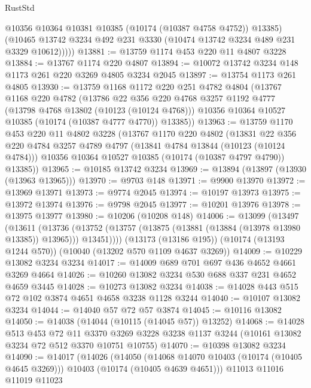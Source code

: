 \begin{lexlean}{RustStd}
\begin{coremodule}
            @10356
            @10364
            @10381
            @10385
            (@10174 (@10387 @4758 @4752))
            @13385)
          (@10465 @13742 @3234 @492 @231 @3330 (@10474 @13742 @3234 @489 @231 @3329 @10612)))))
@13881 := @13759 @1174 @453 @220 @11 @4807 @3228
@13884 := @13767 @1174 @220 @4807
@13894 := @10072 @13742 @3234 @148 @1173 @261 @220 @3269 @4805 @3234 @2045
@13897 := @13754 @1173 @261 @4805
@13930 := @13759
    @1168
    @1172
    @220
    @251
    @4782
    @4804
    (@13767
      @1168
      @220
      @4782
      (@13786
        @22
        @356
        @220
        @4768
        @3257
        @1192
        @4777
        (@13798 @4768 @13802 (@10123 (@10124 @4768)))
        @10356
        @10364
        @10527
        @10385
        (@10174 (@10387 @4777 @4770))
        @13385))
@13963 := @13759
    @1170
    @453
    @220
    @11
    @4802
    @3228
    (@13767
      @1170
      @220
      @4802
      (@13831
        @22
        @356
        @220
        @4784
        @3257
        @4789
        @4797
        (@13841 @4784 @13844 (@10123 (@10124 @4784)))
        @10356
        @10364
        @10527
        @10385
        (@10174 (@10387 @4797 @4790))
        @13385))
@13965 := @10185 @13742 @3234
@13969 := @13894 (@13897 (@13930 (@13963 @13965)))
@13970 := @9703 @148
@13971 := @9900 @13970
@13972 := @13969 @13971
@13973 := @9774 @2045
@13974 := @10197 @13973
@13975 := @13972 @13974
@13976 := @9798 @2045
@13977 := @10201 @13976
@13978 := @13975 @13977
@13980 := @10206 (@10208 @148)
@14006 := @13099
    (@13497
      (@13611
        (@13736 (@13752 (@13757 (@13875 (@13881 (@13884 (@13978 @13980 @13385)) @13965))) @13451))))
    (@13173 (@13186 @195))
    (@10174 (@13193 @1244 @570))
    (@10040 (@13202 @570 @1109 @4637 @3269))
@14009 := @10229 @13082 @3234 @3234
@14017 := @14009 @689 @701 @697 @436 @4652 @4661 @3269 @4664
@14026 := @10260 @13082 @3234 @530 @688 @337 @231 @4652 @4659 @3445
@14028 := @10273 @13082 @3234
@14038 := @14028 @443 @515 @72 @102 @3874 @4651 @4658 @3238 @1128 @3244
@14040 := @10107 @13082 @3234
@14044 := @14040 @57 @72 @57 @3874
@14045 := @10116 @13082
@14050 := @14038 (@14044 (@10115 (@14045 @57)) @13252)
@14068 := @14028
    @513
    @453
    @72
    @11
    @3370
    @3269
    @3228
    @3238
    @1137
    @3244
    (@10161 @13082 @3234 @72 @512 @3370 @10751 @10755)
@14070 := @10398 @13082 @3234
@14090 := @14017
    (@14026
      (@14050
        (@14068 @14070 @10403 (@10174 (@10405 @4645 @3269)))
        @10403
        (@10174 (@10405 @4639 @4651)))
      @11013
      @11016
      @11019
      @11023

\end{coremodule}
\end{lexlean}
